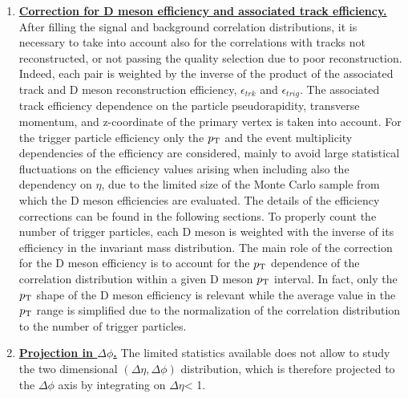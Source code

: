 \begin{enumerate}
\item
\underline{\bf Correction for D meson efficiency and associated track efficiency.}
After filling the signal and background correlation distributions, it is necessary to take into account also for the correlations with tracks not reconstructed, or not passing the quality selection due to poor reconstruction. Indeed, each pair is weighted by the
inverse of the product of the associated track and D meson reconstruction efficiency, $\epsilon_{trk}$ and $\epsilon_{trig}$.
The associated track efficiency dependence on the particle
pseudorapidity, transverse momentum, and z-coordinate of the primary vertex is taken into account. For the trigger particle
efficiency only the $p_{\rm T}$ and the event multiplicity dependencies of the efficiency are considered, mainly to avoid large statistical fluctuations
on the efficiency values arising when including also the dependency on $\eta$, due to the limited
size of the Monte Carlo sample from which the D meson efficiencies are evaluated. %
The details of the efficiency corrections can be found in the following sections. To properly count
the number of trigger particles, each D meson is weighted with the inverse of its efficiency
in the invariant mass distribution. The main role of the correction for the D meson efficiency
is to account for the $p_{\rm T}$ dependence of the correlation distribution within a given
D meson $p_{\rm T}$ interval. In fact, only the $p_{\rm T}$ shape of the D meson efficiency is relevant while the average value
in the $p_{\rm T}$ range is simplified due to the normalization of the correlation distribution to the number of
trigger particles.

\item
\underline {\bf Projection in $\Delta\phi$.}
The limited statistics available does not allow to study the two dimensional
$(\Delta\eta,\Delta\phi)$ distribution, which is therefore projected to the $\Delta\phi$ axis by integrating on $\Delta\eta$< 1.


\end{enumerate}
